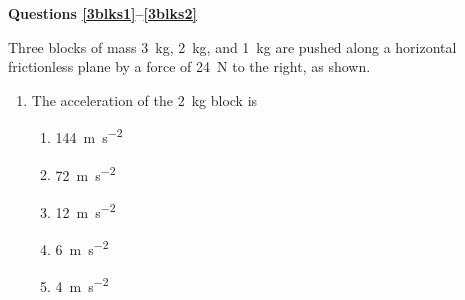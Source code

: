 \documentclass{../../../oss-apphys}
\begin{document}
\begin{multicols}{2}
\begin{enumerate}[resume,leftmargin=18pt]

%    
  \end{enumerate}
  \columnbreak
    
  \textbf{Questions \ref{3blks1}--\ref{3blks2}}

  Three blocks of mass \SI{3}{\kilo\gram}, \SI{2}{\kilo\gram}, and
  \SI{1}{\kilo\gram} are pushed along a horizontal frictionless plane by a
  force of \SI{24}{\newton} to the right, as shown.
  
  \begin{enumerate}[resume,leftmargin=18pt]
  \item The acceleration of the \SI{2}{\kilo\gram} block is
    \begin{enumerate}[nosep,leftmargin=18pt,label=(\Alph*)]
    \item\SI{144}{\metre\per\second\squared}
    \item\SI{72 }{\metre\per\second\squared}
    \item\SI{12 }{\metre\per\second\squared}
    \item\SI{6  }{\metre\per\second\squared}
    \item\SI{4  }{\metre\per\second\squared}
    \end{enumerate}
    \label{3blks1}
    

\end{enumerate}
\end{multicols}
\end{document}

